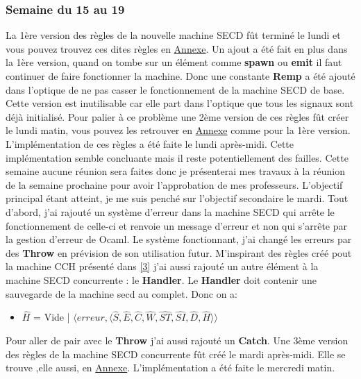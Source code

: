 \documentclass[10pt,a4paper]{article}
\begin{document}
		\subsubsection{Semaine du 15 au 19}
			La 1ère version des règles de la nouvelle machine SECD fût terminé le lundi et vous pouvez trouvez ces dites règles en \hyperref[SECDConc1]{Annexe}. 
			Un ajout a été fait en plus dans la 1ère version, quand on tombe sur un élément comme \textbf{spawn} ou  \textbf{emit} il faut continuer de faire fonctionner la machine. Donc une constante \textbf{Remp} a été ajouté dans l'optique de ne pas casser le fonctionnement de la machine SECD de base.
			\\ Cette version est inutilisable car elle part dans l'optique que tous les signaux sont déjà initialisé.
			\smallbreak
			Pour palier à ce problème une 2ème version de ces règles fût créer le lundi matin, vous pouvez les retrouver en \hyperref[SECDConc2]{Annexe} comme pour la 1ère version.
			\medbreak
			L'implémentation de ces règles a été faite le lundi après-midi. Cette implémentation semble concluante mais il reste potentiellement des failles. Cette semaine aucune réunion sera faites donc je présenterai mes travaux à la réunion de la semaine prochaine pour avoir l'approbation de mes professeurs.
			\smallbreak
			L'objectif principal étant atteint, je me suis penché sur l'objectif secondaire le mardi. 
			\smallbreak
			Tout d'abord, j'ai rajouté un système d'erreur dans la machine SECD qui arrête le fonctionnement de celle-ci et renvoie un message d'erreur et non qui s'arrête par la gestion d'erreur de Ocaml. Le système fonctionnant, j'ai changé les erreurs par des \textbf{Throw} en prévision de son utilisation futur. M'inspirant des règles créé pout la machine CCH présenté dans \hyperref[Calculi]{[3]} j'ai aussi rajouté un autre élément à la machine SECD concurrente : le \textbf{Handler}. Le \textbf{Handler} doit contenir une sauvegarde de la machine secd au complet. Donc on a:
			
			\begin{itemize}
				\item[] $\widehat{H}$ = Vide | $\langle erreur,\langle\widehat{S},\widehat{E},\widehat{C},\widehat{W},\widehat{ST},\widehat{SI},\widehat{D},\widehat{H}\rangle\rangle$
			\end{itemize}
			\smallbreak
			
			Pour aller de pair avec le \textbf{Throw} j'ai aussi rajouté un \textbf{Catch}.
			Une 3ème version des règles de la machine SECD concurrente fût créé le mardi après-midi. Elle se trouve ,elle aussi, en \hyperref[SECDConc3]{Annexe}. L'implémentation a été faite le mercredi matin.
			\medbreak
			
\end{document}
